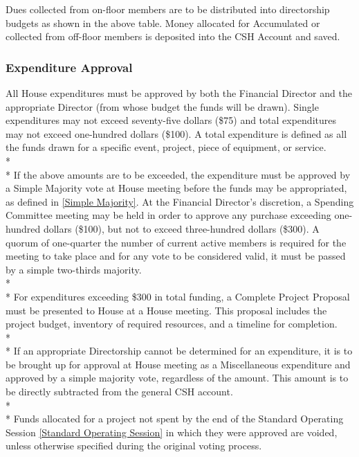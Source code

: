 \documentclass{article}
\newcommand{\asubsection}[1]{\subsubsection{#1} \label{#1}}
\begin{document}

Dues collected from on-floor members are to be distributed into directorship budgets as shown in the above table.
Money allocated for Accumulated or collected from off-floor members is deposited into the CSH Account and saved.

\asubsection{Expenditure Approval}
All House expenditures must be approved by both the Financial Director and the appropriate Director (from whose budget the funds will be drawn).
Single expenditures may not exceed seventy-five dollars (\$75) and total expenditures may not exceed one-hundred dollars (\$100).
A total expenditure is defined as all the funds drawn for a specific event, project, piece of equipment, or service.
\\* \\*
If the above amounts are to be exceeded, the expenditure must be approved by a Simple Majority vote at House meeting before the funds may be appropriated, as defined in \ref{Simple Majority}.
At the Financial Director's discretion, a Spending Committee meeting may be held in order to approve any purchase exceeding one-hundred dollars (\$100), but not to exceed three-hundred dollars (\$300).
A quorum of one-quarter the number of current active members is required for the meeting to take place and for any vote to be considered valid, it must be passed by a simple two-thirds majority.
\\*\\*
For expenditures exceeding \$300 in total funding, a Complete Project Proposal must be presented to House at a House meeting.
This proposal includes the project budget, inventory of required resources, and a timeline for completion.
\\* \\*
If an appropriate Directorship cannot be determined for an expenditure, it is to be brought up for approval at House meeting as a Miscellaneous expenditure and approved by a simple majority vote, regardless of the amount.
This amount is to be directly subtracted from the general CSH account.
\\* \\*
Funds allocated for a project not spent by the end of the Standard Operating Session \ref{Standard Operating Session} in which they were approved are voided, unless otherwise specified during the original voting process.
\end{document}
